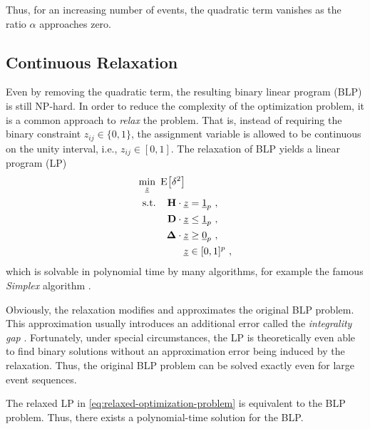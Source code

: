 \documentclass[journal, 10pt]{IEEEtran}
\begin{document}
Thus, for an increasing number of events, the quadratic term vanishes as the ratio $\alpha$ approaches zero. 

		
\subsection{Continuous Relaxation}
\label{sec:lp_relax}
%
Even by removing the quadratic term, the resulting binary linear program (BLP) is still NP-hard. %
In order to reduce the complexity of the optimization problem, it is a common approach to \emph{relax} the problem. That is, instead of requiring the binary constraint $z_{ij}\in\{0,1\}$, the assignment variable is allowed to be continuous on the unity interval, i.e., $z_{ij} \in [0,1]$. The relaxation of BLP yields a linear program (LP)
%
\begin{align}
	\label{eq:relaxed-optimization-problem}
	\min_{\vz} \ \E\hspace{-.5mm}\big[\delta^2 \big] \ & \\
	\text{s.t.} \hspace{4mm} \H \cdot \vz &= \vec 1_p~,\\
		 \D \cdot \vz &\le \vec 1_p~, \\
	 \mat \Delta \cdot \vz &\ge \vec 0_p~, \\
		\vz &\in [0,1]^p~,
\end{align}
%
which is solvable in polynomial time by many algorithms, for example the famous \emph{Simplex} algorithm \cite{NelderMead1965}. 

Obviously, the relaxation modifies and approximates the original BLP problem. This approximation usually introduces an additional error called the \emph{integrality gap} \cite{Arora2002}. Fortunately, under special circumstances, the LP is theoretically even able to find binary solutions without an approximation error being induced by the relaxation. Thus, the original BLP problem can be solved exactly even for large event sequences. 

\begin{Theorem}
The relaxed LP in \eqref{eq:relaxed-optimization-problem} is equivalent to the BLP problem. Thus, there exists a polynomial-time solution for the BLP.
\end{Theorem}
\end{document}
